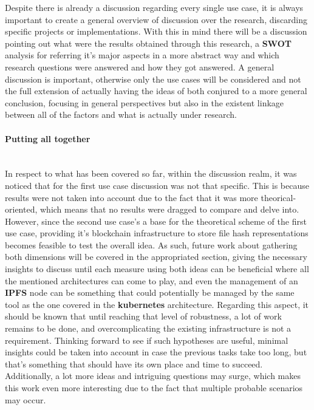 Despite there is already a discussion regarding every single use case, it is always important to create a general overview of discussion over the research, discarding specific projects or implementations. With this in mind there will be a discussion pointing out what were the results obtained through this research, a \textbf{SWOT} analysis for referring it's major aspects in a more abstract way and which research questions were answered and how they got answered. 
A general discussion is important, otherwise only the use cases will be considered and not the full extension of actually having the ideas of both conjured to a more general conclusion, focusing in general perspectives but also in the existent linkage between all of the factors and what is actually under research.

\paragraph{Putting all together}\mbox{}\\
In respect to what has been covered so far, within the discussion realm, it was noticed that for the first use case discussion was not that specific. This is because results were not taken into account due to the fact that it was more theorical-oriented, which means that no results were dragged to compare and delve into. However, since the second use case's a base for the theoretical scheme of the first use case, providing it's blockchain infrastructure to store file hash representations becomes feasible to test the overall idea. As such, future work about gathering both dimensions will be covered in the appropriated section, giving the necessary insights to discuss until each measure using both ideas can be beneficial where all the mentioned architectures can come to play, and even the management of an \textbf{IPFS} node can be something that could potentially be managed by the same tool as the one covered in the \textbf{kubernetes} architecture. Regarding this aspect, it should be known that until reaching that level of robustness, a lot of work remains to be done, and overcomplicating the existing infrastructure is not a requirement. Thinking forward to see if such hypotheses are useful, minimal insights could be taken into account in case the previous tasks take too long, but that's something that should have its own place and time to succeed. Additionally, a lot more ideas and intriguing questions may surge, which makes this work even more interesting due to the fact that multiple probable scenarios may occur.


